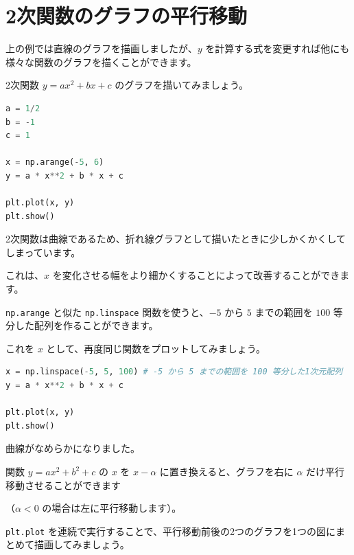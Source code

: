 \section{2次関数のグラフの平行移動}


上の例では直線のグラフを描画しましたが、$y$ を計算する式を変更すれば他にも様々な関数のグラフを描くことができます。

2次関数 $y = ax^2 + bx + c$ のグラフを描いてみましょう。


\begin{lstlisting}[style=codecell,language=Python]
a = 1/2
b = -1
c = 1

x = np.arange(-5, 6)
y = a * x**2 + b * x + c

plt.plot(x, y)
plt.show()
\end{lstlisting}


2次関数は曲線であるため、折れ線グラフとして描いたときに少しかくかくしてしまっています。

これは、$x$ を変化させる幅をより細かくすることによって改善することができます。

\texttt{np.arange} と似た \texttt{np.linspace} 関数を使うと、$-5$ から $5$ までの範囲を $100$ 等分した配列を作ることができます。

これを $x$ として、再度同じ関数をプロットしてみましょう。


\begin{lstlisting}[style=codecell,language=Python]
x = np.linspace(-5, 5, 100) # -5 から 5 までの範囲を 100 等分した1次元配列
y = a * x**2 + b * x + c

plt.plot(x, y)
plt.show()
\end{lstlisting}


曲線がなめらかになりました。


関数 $y = ax^2 + b^2 + c$ の $x$ を $x - \alpha$ に置き換えると、グラフを右に $\alpha$ だけ平行移動させることができます

（$\alpha < 0$ の場合は左に平行移動します）。


\texttt{plt.plot} を連続で実行することで、平行移動前後の2つのグラフを1つの図にまとめて描画してみましょう。


